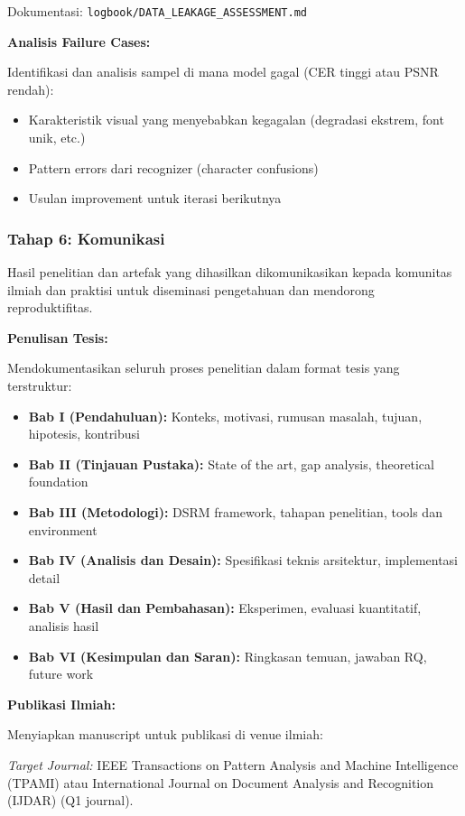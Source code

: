 \documentclass[12pt,a4paper]{article}
\begin{document}
Dokumentasi: \texttt{logbook/DATA\_LEAKAGE\_ASSESSMENT.md}

\textbf{Analisis Failure Cases:}

Identifikasi dan analisis sampel di mana model gagal (CER tinggi atau PSNR rendah):
\begin{itemize}[leftmargin=*, nosep]
\item Karakteristik visual yang menyebabkan kegagalan (degradasi ekstrem, font unik, etc.)
\item Pattern errors dari recognizer (character confusions)
\item Usulan improvement untuk iterasi berikutnya
\end{itemize}

\subsubsection{Tahap 6: Komunikasi}
\label{subsubsec:komunikasi}

Hasil penelitian dan artefak yang dihasilkan dikomunikasikan kepada komunitas ilmiah dan praktisi untuk diseminasi pengetahuan dan mendorong reproduktifitas.

\textbf{Penulisan Tesis:}

Mendokumentasikan seluruh proses penelitian dalam format tesis yang terstruktur:
\begin{itemize}[leftmargin=*, nosep]
\item \textbf{Bab I (Pendahuluan):} Konteks, motivasi, rumusan masalah, tujuan, hipotesis, kontribusi
\item \textbf{Bab II (Tinjauan Pustaka):} State of the art, gap analysis, theoretical foundation
\item \textbf{Bab III (Metodologi):} DSRM framework, tahapan penelitian, tools dan environment
\item \textbf{Bab IV (Analisis dan Desain):} Spesifikasi teknis arsitektur, implementasi detail
\item \textbf{Bab V (Hasil dan Pembahasan):} Eksperimen, evaluasi kuantitatif, analisis hasil
\item \textbf{Bab VI (Kesimpulan dan Saran):} Ringkasan temuan, jawaban RQ, future work
\end{itemize}

\textbf{Publikasi Ilmiah:}

Menyiapkan manuscript untuk publikasi di venue ilmiah:

\textit{Target Journal:} IEEE Transactions on Pattern Analysis and Machine Intelligence (TPAMI) atau International Journal on Document Analysis and Recognition (IJDAR) (Q1 journal).
\end{document}
